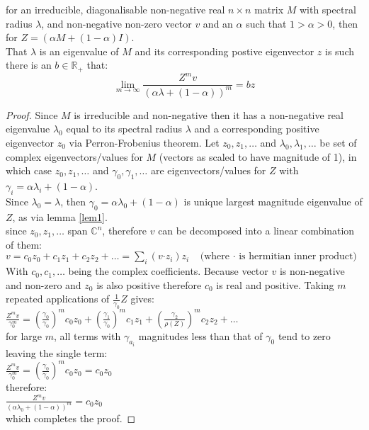 \begin{Theorem}\label{th:0}
for an irreducible, diagonalisable non-negative real $n\times n$ matrix $M$ with spectral radius $\lambda$, and non-negative non-zero vector $v$ and an $\alpha$ such that $1>\alpha>0$, then for $Z=(\alpha M+(1-\alpha)I)$.\\
That $\lambda$ is an eigenvalue of $M$ and its corresponding postive eigenvector $z$ is such there is an $b\in \mathbb{R_+}$ that: $$\lim_{m\rightarrow\infty}\frac{Z^mv}{(\alpha\lambda+(1-\alpha))^m}=bz$$
\end{Theorem}
\begin{proof}
Since $M$ is irreducible and non-negative then it has a non-negative real eigenvalue $\lambda_0$ equal to its spectral radius $\lambda$ and a corresponding positive eigenvector $z_0$ via Perron-Frobenius theorem.
Let $z_0,z_1,\dots$ and $\lambda_0,\lambda_1,\dots$ be set of complex eigenvectors/values for $M$ (vectors as scaled to have magnitude of 1), in which case $z_0,z_1,\dots$ and $\gamma_0,\gamma_1,\dots$ are eigenvectors/values for $Z$ with $\gamma_i=\alpha\lambda_i+(1-\alpha)$.\\
Since $\lambda_0=\lambda$, then $\gamma_0=\alpha\lambda_0+(1-\alpha)$ is unique largest magnitude eigenvalue of $Z$, as via lemma \ref{lem1}.\\
since $z_0,z_1,\dots$ span $\mathbb{C}^n$, therefore $v$ can be decomposed into a linear combination of them:\\
$v = c_0z_0 + c_1z_1 + c_2z_2 +\dots = \sum_i(v\boldsymbol{\cdot}z_i)z_i~~~~~\text{(where $\boldsymbol{\cdot}$ is hermitian inner product)}$\\
With $c_0,c_1,\dots$ being the complex coefficients. Because vector $v$ is non-negative and non-zero and $z_0$ is also positive therefore $c_0$ is real and positive.
Taking $m$ repeated applications of $\frac{1}{\gamma_0}Z$ gives:\\
$\frac{Z^mv}{\gamma_0^m} = \left(\frac{\gamma_0}{\gamma_0}\right)^mc_0z_0 + \left(\frac{\gamma_{1}}{\gamma_0}\right)^mc_1z_1 + \left(\frac{\gamma_{2}}{\rho(Z)}\right)^mc_2z_2 + \dots$\\
for large $m$, all terms with $\gamma_{a_i}$ magnitudes less than that of $\gamma_0$ tend to zero leaving the single term:\\
$\frac{Z^mv}{\gamma_0^m} = \left(\frac{\gamma_0}{\gamma_0}\right)^mc_0z_0=c_0z_0$\\
therefore:\\
$\frac{Z^mv}{(\alpha\lambda_0+(1-\alpha))^m} = c_0z_0$\\
which completes the proof.
\end{proof}


